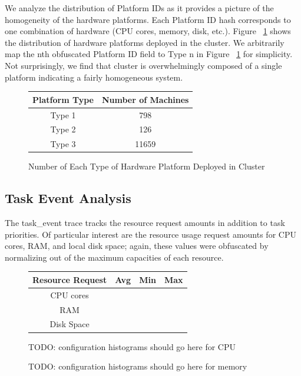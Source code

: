 \documentclass{sig-alternate}
\begin{document}
We analyze the distribution of Platform IDs as it provides a picture of the homogeneity of the hardware platforms.
Each Platform ID hash corresponds to one combination of hardware (CPU cores, memory, disk, etc.).
Figure ~\ref{platform_dist} shows the distribution of hardware platforms deployed in the cluster.
We arbitrarily map the nth obfuscated Platform ID field to Type n in Figure ~\ref{platform_dist} for simplicity.
Not surprisingly, we find that cluster is overwhelmingly composed of a single platform indicating a fairly homogeneous system.

\begin{figure}
\centering
\begin{tabular}{| c | c |} \hline
Platform Type & Number of Machines\\ \hline
Type 1 & 798\\ \hline
Type 2 & 126\\ \hline
Type 3 & 11659 \\ \hline
\end{tabular}
\label{platform_dist}
\caption{Number of Each Type of Hardware Platform Deployed in Cluster}
\end{figure}

\subsection{Task Event Analysis}

The task\_event trace tracks the resource request amounts in addition to task priorities.
Of particular interest are the resource usage request amounts for CPU cores, RAM, and local disk space; again, these values were obfuscated by normalizing out of the maximum capacities of each resource.

\begin{figure}
\centering
\begin{tabular}{| c | c | c | c |} \hline
Resource Request & Avg & Min & Max \\ \hline
CPU cores & & & \\ \hline
RAM & & & \\ \hline
Disk Space & & & \\ \hline
\end{tabular}
\end{figure}

\begin{figure}
TODO: configuration histograms should go here for CPU
\end{figure}

\begin{figure}
TODO: configuration histograms should go here for memory
\end{figure}
\end{document}

